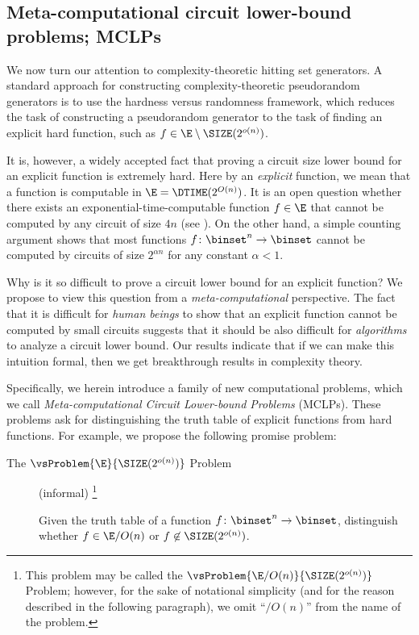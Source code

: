 \documentclass{toc}
\begin{document}
%
\subsection{Meta-computational circuit lower-bound problems; MCLPs}
\label{section_ComplexityHSG}

We now turn our attention to complexity-theoretic hitting set generators.
A standard approach for constructing complexity-theoretic pseudorandom generators
is to use the hardness versus randomness framework,
which reduces the task of constructing
a pseudorandom generator
to the task of finding an explicit hard function, such as $f \in \E \setminus \SIZE(2^{o(n)})$.

It is, however, a widely accepted fact that
proving a circuit size lower bound for an explicit function is extremely hard.
Here by an \emph{explicit} function, we mean that a function is computable in $\E = \DTIME(2^{O(n)})$.
It is an open question
whether there exists an exponential-time-computable function $f \in \E$
that cannot be computed by any circuit of size $4 n$
%
(see \cite{FindGHK16_focs_conf}).  %
On the other hand, a simple counting argument
shows that
most functions $f \colon \binset^n \to \binset$
cannot be computed by circuits of size $2^{\alpha n}$ for any constant $\alpha < 1$.

Why is it so difficult to prove a circuit lower bound for an explicit function?
We propose to view this question from a \emph{meta-computational} perspective.
The fact that it is difficult for \emph{human beings} to show that an explicit function
cannot be computed by small circuits
suggests
that
it should be also difficult for \emph{algorithms} to analyze a circuit lower bound.
Our results indicate that
if we can make this intuition formal, then we get breakthrough results in complexity theory.

Specifically,
we herein introduce a family of new computational problems,
which we call \emph{Meta-computational Circuit Lower-bound Problems} (MCLPs).
These problems ask for distinguishing the truth table of explicit functions
from hard functions.
For example, we propose the following promise problem:
\begin{description}
  \item
        [The $\vsProblem{\E}{\SIZE(2^{o(n)})}$ Problem] (informal)%
        \footnote{This problem may be called the $\vsProblem{\E/O(n)}{\SIZE(2^{o(n)})}$ Problem; however, for the sake of notational simplicity (and for the reason described in the following paragraph), we omit ``$/O(n)$'' from the name of the problem.}
        \hspace{0em}

        Given the truth table of a function $f \colon \binset^n \to \binset$,
        distinguish whether
        $f \in \E / O(n)$
        or
        $f \not\in \SIZE(2^{o(n)})$.
\end{description}
\end{document}
